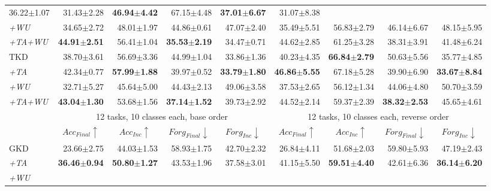 \begin{appendix}
\begin{table*}
{\begin{tabular}{@{}lrrrrrrrr@{}}
  36.22$\pm$1.07 &
  31.43$\pm$2.28 &
  \textbf{46.94$\pm$4.42} &
  67.15$\pm$4.48 &
  \textbf{37.01$\pm$6.67} &
  31.07$\pm$8.38 \\
\textit{+WU} &
  34.65$\pm$2.72 &
  48.01$\pm$1.97 &
  44.86$\pm$0.61 &
  47.07$\pm$2.40 &
  35.49$\pm$5.51 &
  56.83$\pm$2.79 &
  46.14$\pm$6.67 &
  48.15$\pm$5.95 \\
\textit{+TA+WU} &
  \textbf{44.91$\pm$2.51} &
  56.41$\pm$1.04 &
  \textbf{35.53$\pm$2.19} &
  34.47$\pm$0.71 &
  44.62$\pm$2.85 &
  61.25$\pm$3.28 &
  38.31$\pm$3.91 &
  41.48$\pm$6.24 \\ \midrule
TKD &
  38.70$\pm$3.61 &
  56.69$\pm$3.36 &
  44.99$\pm$1.04 &
  33.86$\pm$1.36 &
  40.23$\pm$4.35 &
  \textbf{66.84$\pm$2.79} &
  50.63$\pm$5.56 &
  35.77$\pm$4.85 \\
\textit{+TA} &
  42.34$\pm$0.77 &
  \textbf{57.99$\pm$1.88} &
  39.97$\pm$0.52 &
  \textbf{33.79$\pm$1.80} &
  \textbf{46.86$\pm$5.55} &
  67.18$\pm$5.28 &
  39.90$\pm$6.90 &
  \textbf{33.67$\pm$8.84} \\
\textit{+WU} &
  32.71$\pm$5.27 &
  45.64$\pm$5.00 &
  44.43$\pm$2.13 &
  49.06$\pm$3.58 &
  37.53$\pm$2.65 &
  56.12$\pm$1.34 &
  44.06$\pm$4.80 &
  50.70$\pm$3.59 \\
\textit{+TA+WU} &
  \textbf{43.04$\pm$1.30} &
  53.68$\pm$1.56 &
  \textbf{37.14$\pm$1.52} &
  39.73$\pm$2.92 &
  44.52$\pm$2.14 &
  59.37$\pm$2.39 &
  \textbf{38.32$\pm$2.53} &
  45.65$\pm$4.61 \\ \midrule
 &
  \multicolumn{4}{c}{12 tasks, 10 classes each, base order} &
  \multicolumn{4}{c}{12 tasks, 10 classes each, reverse order} \\ \cmidrule{2-9}
 &
\multicolumn{1}{c}{$Acc_{Final} \uparrow$} &
  \multicolumn{1}{c}{$Acc_{Inc} \uparrow$} &
  \multicolumn{1}{c}{$Forg_{Final} \downarrow$} &
  \multicolumn{1}{c}{$Forg_{Inc} \downarrow$} &
  \multicolumn{1}{c}{$Acc_{Final} \uparrow$} &
  \multicolumn{1}{c}{$Acc_{Inc} \uparrow$} &
  \multicolumn{1}{c}{$Forg_{Final} \downarrow$} &
  \multicolumn{1}{c}{$Forg_{Inc} \downarrow$} \\ \midrule
GKD &
  23.66$\pm$2.75 &
  44.03$\pm$1.53 &
  58.93$\pm$1.75 &
  42.70$\pm$2.32 &
  26.84$\pm$4.11 &
  51.68$\pm$2.03 &
  59.80$\pm$5.93 &
  47.19$\pm$2.43 \\
\textit{+TA} &
  \textbf{36.46$\pm$0.94} &
  \textbf{50.80$\pm$1.27} &
  43.53$\pm$1.96 &
  37.58$\pm$3.01 &
  41.15$\pm$5.50 &
  \textbf{59.51$\pm$4.40} &
  42.61$\pm$6.36 &
  \textbf{36.14$\pm$6.20} \\
\textit{+WU} &

\end{tabular}}
\end{table*}
\end{appendix}
